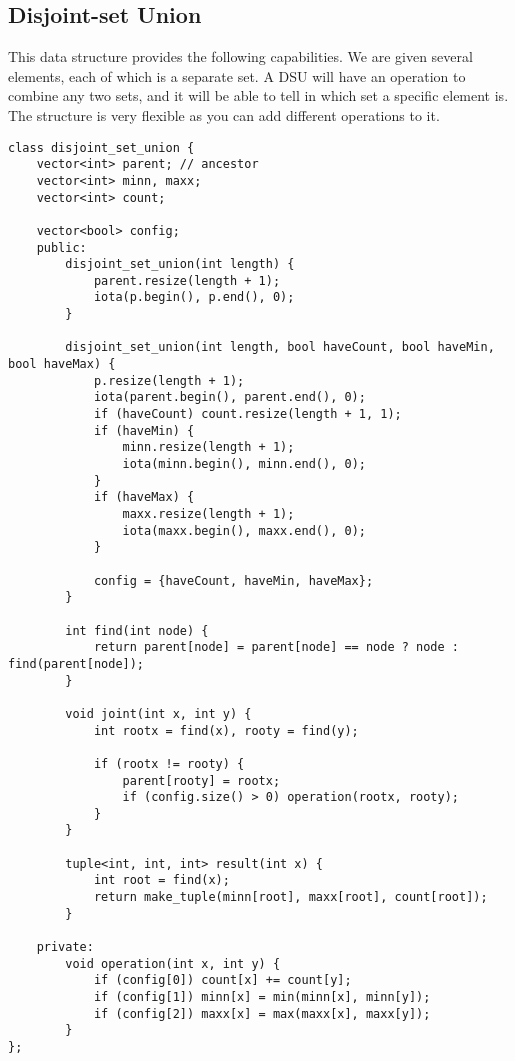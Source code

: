 \subsection{Disjoint-set Union}
This data structure provides the following capabilities. 
We are given several elements, each of which is a separate set. 
A DSU will have an operation to combine any two sets, 
and it will be able to tell in which set a specific element is. 
The structure is very flexible as you can add different operations to it.
\begin{lstlisting}
class disjoint_set_union {
    vector<int> parent; // ancestor
    vector<int> minn, maxx;
    vector<int> count;
    
    vector<bool> config;
    public:
        disjoint_set_union(int length) {
            parent.resize(length + 1);
            iota(p.begin(), p.end(), 0);
        }
        
        disjoint_set_union(int length, bool haveCount, bool haveMin, bool haveMax) {
            p.resize(length + 1);
            iota(parent.begin(), parent.end(), 0);
            if (haveCount) count.resize(length + 1, 1);
            if (haveMin) {
                minn.resize(length + 1);
                iota(minn.begin(), minn.end(), 0);
            }
            if (haveMax) {
                maxx.resize(length + 1);
                iota(maxx.begin(), maxx.end(), 0);
            }
            
            config = {haveCount, haveMin, haveMax};
        }
        
        int find(int node) {
            return parent[node] = parent[node] == node ? node : find(parent[node]);
        }
        
        void joint(int x, int y) {
            int rootx = find(x), rooty = find(y);

            if (rootx != rooty) {
                parent[rooty] = rootx;
                if (config.size() > 0) operation(rootx, rooty);
            }
        }
        
        tuple<int, int, int> result(int x) {
            int root = find(x);
            return make_tuple(minn[root], maxx[root], count[root]);
        }
        
    private:
        void operation(int x, int y) {
            if (config[0]) count[x] += count[y];
            if (config[1]) minn[x] = min(minn[x], minn[y]);
            if (config[2]) maxx[x] = max(maxx[x], maxx[y]);
        }
};
\end{lstlisting}